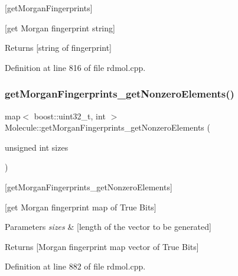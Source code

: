 \mbox{[}get\+Morgan\+Fingerprints\mbox{]} 

\mbox{[}get Morgan fingerprint string\mbox{]}

\begin{DoxyReturn}{Returns}
\mbox{[}string of fingerprint\mbox{]} 
\end{DoxyReturn}


Definition at line 816 of file rdmol.\+cpp.

\mbox{\label{class_molecule_aecd6b243dc5b420306cad9ba3a996101}} 
\subsubsection{\texorpdfstring{get\+Morgan\+Fingerprints\+\_\+get\+Nonzero\+Elements()}{getMorganFingerprints\_getNonzeroElements()}}
{\footnotesize\ttfamily map$<$ boost\+::uint32\+\_\+t, int $>$ Molecule\+::get\+Morgan\+Fingerprints\+\_\+get\+Nonzero\+Elements (\begin{DoxyParamCaption}\item[{unsigned int}]{sizes }\end{DoxyParamCaption})}



\mbox{[}get\+Morgan\+Fingerprints\+\_\+get\+Nonzero\+Elements\mbox{]} 

\mbox{[}get Morgan fingerprint map of True Bits\mbox{]}


\begin{DoxyParams}{Parameters}
{\em sizes} & \mbox{[}length of the vector to be generated\mbox{]} \\
\hline
\end{DoxyParams}
\begin{DoxyReturn}{Returns}
\mbox{[}Morgan fingerprint map vector of True Bits\mbox{]} 
\end{DoxyReturn}


Definition at line 882 of file rdmol.\+cpp.

\mbox{\label{class_molecule_ace01e8dc28ea916279af4905fa4a5d4c}} 
